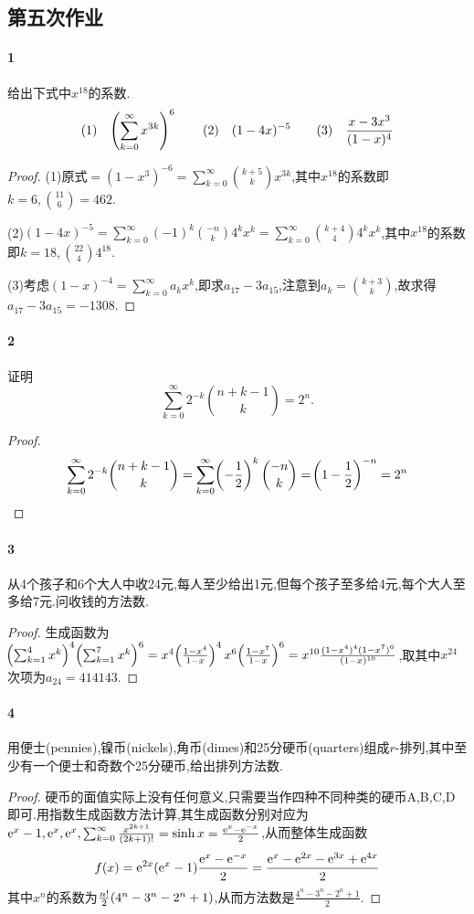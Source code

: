 \documentclass[11pt]{article}
\begin{document}
\subsection{第五次作业}
\paragraph{1}给出下式中$x^{18}$的系数.
$$(1)\quad \!\left(\sum_{k=0}^{\infty}x^{3k}\right)^6\qquad (2)\quad (1-4x)^{-5} \qquad (3)\quad \frac{x-3x^3}{(1-x)^4}$$
\begin{proof}
    (1)原式$=(1-x^3)^{-6}=\sum_{k=0}^\infty \binom{k+5}{k}x^{3k}$,其中$x^{18}$的系数即$k=6,\binom{11}{6}=462$.
    
    (2)$(1-4x)^{-5}=\sum_{k=0}^{\infty}(-1)^k\binom{-n}{k}4^kx^k=\sum_{k=0}^{\infty}\binom{k+4}{4}4^kx^k$,其中$x^{18}$的系数即$k=18,\binom{22}{4}4^{18}$.
    
    (3)考虑$(1-x)^{-4}=\sum_{k=0}^{\infty}a_kx^k$,即求$a_{17}-3a_{15}$,注意到$a_k=\binom{k+3}{k}$,故求得$a_{17}-3a_{15}=-1308$.
\end{proof}


\paragraph{2}证明$$\sum_{k=0}^{\infty}2^{-k}\binom{n+k-1}{k}=2^n.$$

\begin{proof}
    $$\sum_{k=0}^{\infty}2^{-k}\binom{n+k-1}{k}=\sum_{k=0}^{\infty}\!\left(-\frac{1}{2}\right)^k\binom{-n}{k}=\!\left(1-\frac{1}{2}\right)^{-n}=2^n$$
\end{proof}

\paragraph{3}从4个孩子和6个大人中收24元,每人至少给出1元,但每个孩子至多给4元,每个大人至多给7元.问收钱的方法数.
\begin{proof}
    生成函数为$\!\left(\sum_{k=1}^4 x^k\right)^4 \!\left(\sum_{k=1}^{7}x^k\right)^6=x^4\!\left(\frac{1-x^4}{1-x}\right)^4 x^6\!\left(\frac{1-x^7}{1-x}\right)^6=x^{10}\frac{(1-x^4)^4(1-x^7)^6}{(1-x)^{10}}$,取其中$x^{24}$次项为$a_{24}=414143$.
\end{proof}

\paragraph{4}用便士(pennies),镍币(nickels),角币(dimes)和25分硬币(quarters)组成$r$-排列,其中至少有一个便士和奇数个25分硬币,给出排列方法数.
\begin{proof}
    硬币的面值实际上没有任何意义,只需要当作四种不同种类的硬币A,B,C,D即可.用指数生成函数方法计算,其生成函数分别对应为$\mathrm{e}^x-1, \mathrm{e}^x, \mathrm{e}^x, \sum_{k=0}^{\infty}\frac{x^{2k+1}}{(2k+1)!}=\sinh x=\frac{\mathrm{e}^x-\mathrm{e}^{-x}}{2}$,从而整体生成函数$$f(x)=\mathrm{e}^{2x}(\mathrm{e}^x-1)\frac{\mathrm{e}^x-\mathrm{e}^{-x}}{2}=\frac{\mathrm{e}^x-\mathrm{e}^{2x}-\mathrm{e}^{3x}+\mathrm{e}^{4x}}{2}$$
    其中$x^n$的系数为$\frac{n!}{2}\!\left(4^n-3^n-2^n+1\right)$,从而方法数是$\frac{4^n-3^n-2^n+1}{2}$.
\end{proof}
\end{document}
